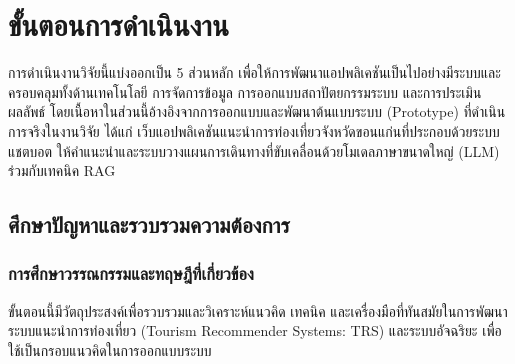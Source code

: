
\section{ขั้นตอนการดำเนินงาน}

การดำเนินงานวิจัยนี้แบ่งออกเป็น 5 ส่วนหลัก เพื่อให้การพัฒนาแอปพลิเคชันเป็นไปอย่างมีระบบและครอบคลุมทั้งด้านเทคโนโลยี การจัดการข้อมูล การออกแบบสถาปัตยกรรมระบบ และการประเมินผลลัพธ์ โดยเนื้อหาในส่วนนี้อ้างอิงจากการออกแบบและพัฒนาต้นแบบระบบ (Prototype) ที่ดำเนินการจริงในงานวิจัย ได้แก่ เว็บแอปพลิเคชันแนะนำการท่องเที่ยวจังหวัดขอนแก่นที่ประกอบด้วยระบบ แชตบอต ให้คำแนะนำและระบบวางแผนการเดินทางที่ขับเคลื่อนด้วยโมเดลภาษาขนาดใหญ่ (LLM) ร่วมกับเทคนิค RAG

\subsection{ศึกษาปัญหาและรวบรวมความต้องการ}

\subsubsection{การศึกษาวรรณกรรมและทฤษฎีที่เกี่ยวข้อง}

ขั้นตอนนี้มีวัตถุประสงค์เพื่อรวบรวมและวิเคราะห์แนวคิด เทคนิค และเครื่องมือที่ทันสมัยในการพัฒนาระบบแนะนำการท่องเที่ยว (Tourism Recommender Systems: TRS) และระบบอัจฉริยะ เพื่อใช้เป็นกรอบแนวคิดในการออกแบบระบบ


